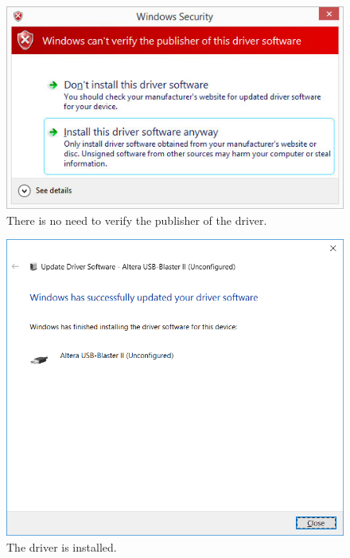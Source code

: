 \documentclass[11pt, twoside, pdftex]{article}
\begin{document}
~\\
~\\
\begin{figure}[H]
	\begin{center}
		\includegraphics[scale=0.65]{figures/figure13.png}
		\caption{There is no need to verify the publisher of the driver.} 
		\label{fig:13}
	\end{center}
\end{figure}

\begin{figure}[H]
	\begin{center}
		\includegraphics[scale=0.65]{figures/figure14.png}
		\caption{The driver is installed.} 
		\label{fig:14}
	\end{center}
\end{figure}
\end{document}
